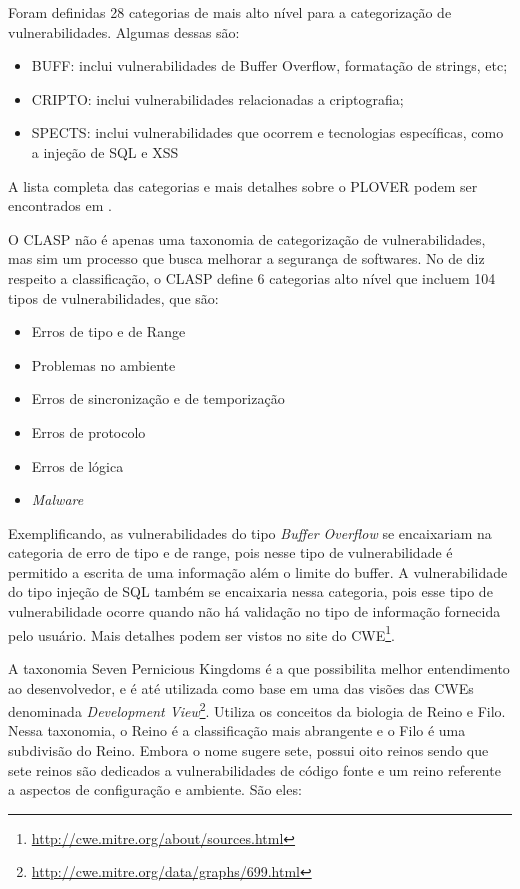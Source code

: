 %

Foram definidas 28 categorias de mais alto nível para a categorização de vulnerabilidades. Algumas dessas são:

\begin{itemize}
\item BUFF: inclui vulnerabilidades de Buffer Overflow, formatação de strings, etc;
\item CRIPTO: inclui vulnerabilidades relacionadas a criptografia;
\item SPECTS: inclui vulnerabilidades que ocorrem e tecnologias específicas, como a injeção de SQL e XSS
\end{itemize}

A lista completa das categorias e mais detalhes sobre o PLOVER podem ser encontrados em \cite{christey2006}.

%

O CLASP não é apenas uma taxonomia de categorização de vulnerabilidades, mas sim um processo que busca melhorar a segurança de softwares. No de diz respeito a classificação, o CLASP define 6 categorias alto nível que incluem 104 tipos de vulnerabilidades, que são:

\begin{itemize}
\item Erros de tipo e de Range
\item Problemas no ambiente
\item Erros de sincronização e de temporização
\item Erros de protocolo
\item Erros de lógica
\item \emph{Malware}
\end{itemize}

%
Exemplificando, as vulnerabilidades do tipo \emph{Buffer Overflow} se encaixariam na categoria de erro de tipo e de range, pois nesse tipo de vulnerabilidade é permitido a escrita de uma informação além o limite do buffer. A vulnerabilidade do tipo  injeção de SQL também se encaixaria nessa categoria, pois esse tipo de vulnerabilidade ocorre quando não há validação no tipo de informação fornecida pelo usuário. Mais detalhes podem ser vistos no site do CWE\footnote{\url{http://cwe.mitre.org/about/sources.html}}.

%

A taxonomia Seven Pernicious Kingdoms é a que possibilita melhor entendimento ao desenvolvedor, e é até utilizada como base em uma das visões das CWEs denominada \emph{Development View}\footnote{\url{http://cwe.mitre.org/data/graphs/699.html}}. Utiliza os conceitos da biologia de Reino e Filo. Nessa taxonomia, o Reino é a classificação mais abrangente e o Filo é uma subdivisão do Reino. Embora o nome sugere sete, possui oito reinos sendo que sete reinos são dedicados a vulnerabilidades de código fonte e um reino referente a aspectos de configuração e ambiente. São eles:

